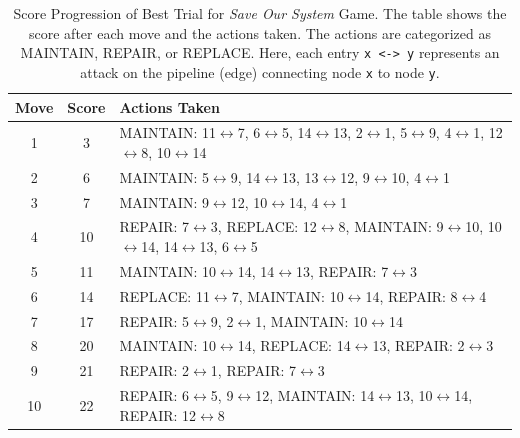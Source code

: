\documentclass[12pt,a4paper]{article}
\begin{document}
        \begin{table}
            \centering
            \begin{tabular}{ccp{12cm}}
            \toprule
            \textbf{Move} & \textbf{Score} & \textbf{Actions Taken} \\
            \midrule
            1 & 3 & MAINTAIN: 11\texttt{$\leftrightarrow$}7, 6\texttt{$\leftrightarrow$}5, 14\texttt{$\leftrightarrow$}13, 2\texttt{$\leftrightarrow$}1, 5\texttt{$\leftrightarrow$}9, 4\texttt{$\leftrightarrow$}1, 12\texttt{$\leftrightarrow$}8, 10\texttt{$\leftrightarrow$}14 \\
            2 & 6 & MAINTAIN: 5\texttt{$\leftrightarrow$}9, 14\texttt{$\leftrightarrow$}13, 13\texttt{$\leftrightarrow$}12, 9\texttt{$\leftrightarrow$}10, 4\texttt{$\leftrightarrow$}1 \\
            3 & 7 & MAINTAIN: 9\texttt{$\leftrightarrow$}12, 10\texttt{$\leftrightarrow$}14, 4\texttt{$\leftrightarrow$}1 \\
            4 & 10 & REPAIR: 7\texttt{$\leftrightarrow$}3, REPLACE: 12\texttt{$\leftrightarrow$}8, MAINTAIN: 9\texttt{$\leftrightarrow$}10, 10\texttt{$\leftrightarrow$}14, 14\texttt{$\leftrightarrow$}13, 6\texttt{$\leftrightarrow$}5 \\
            5 & 11 & MAINTAIN: 10\texttt{$\leftrightarrow$}14, 14\texttt{$\leftrightarrow$}13, REPAIR: 7\texttt{$\leftrightarrow$}3 \\
            6 & 14 & REPLACE: 11\texttt{$\leftrightarrow$}7, MAINTAIN: 10\texttt{$\leftrightarrow$}14, REPAIR: 8\texttt{$\leftrightarrow$}4 \\
            7 & 17 & REPAIR: 5\texttt{$\leftrightarrow$}9, 2\texttt{$\leftrightarrow$}1, MAINTAIN: 10\texttt{$\leftrightarrow$}14 \\
            8 & 20 & MAINTAIN: 10\texttt{$\leftrightarrow$}14, REPLACE: 14\texttt{$\leftrightarrow$}13, REPAIR: 2\texttt{$\leftrightarrow$}3 \\
            9 & 21 & REPAIR: 2\texttt{$\leftrightarrow$}1, REPAIR: 7\texttt{$\leftrightarrow$}3 \\
            10 & 22 & REPAIR: 6\texttt{$\leftrightarrow$}5, 9\texttt{$\leftrightarrow$}12, MAINTAIN: 14\texttt{$\leftrightarrow$}13, 10\texttt{$\leftrightarrow$}14, REPAIR: 12\texttt{$\leftrightarrow$}8 \\
            \bottomrule
            \end{tabular}
            \caption{Score Progression of Best Trial for \textit{Save Our System} Game. The table shows the score after each move and the actions taken. The actions are categorized as MAINTAIN, REPAIR, or REPLACE. Here, each entry \texttt{x <-> y} represents an attack on the pipeline (edge) connecting node \texttt{x} to node \texttt{y}.}
            \label{tab:score-progression}
        \end{table}
\end{document}
